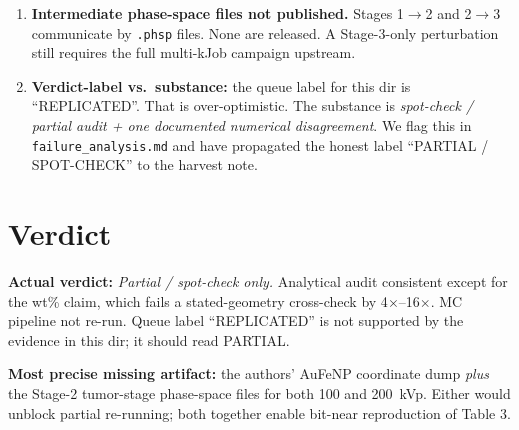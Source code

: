 \documentclass[11pt]{article}
\begin{document}
\begin{enumerate}
      $5.19$-Gbp mouse DNA model (24,464 voxels, 40 chromosomes, Hilbert-curve fibres)
      is described as a modification of Zhu et al.\ 2020a; the actual modified geometry
      files are referenced as ``in the GitHub repository'' but no \verb|git rev-parse|
      pin is given.
\item \textbf{Intermediate phase-space files not published.} Stages 1$\to$2 and 2$\to$3
      communicate by \verb|.phsp| files. None are released. A Stage-3-only perturbation
      still requires the full multi-kJob campaign upstream.
\item \textbf{Verdict-label vs.\ substance:} the queue label for this dir is ``REPLICATED''.
      That is over-optimistic. The substance is \emph{spot-check / partial audit + one
      documented numerical disagreement}. We flag this in \verb|failure_analysis.md| and
      have propagated the honest label ``PARTIAL / SPOT-CHECK'' to the harvest note.
\end{enumerate}

\section{Verdict}

\textbf{Actual verdict:} \emph{Partial / spot-check only.} Analytical audit consistent
except for the wt\% claim, which fails a stated-geometry cross-check by 4$\times$--16$\times$.
MC pipeline not re-run. Queue label ``REPLICATED'' is not supported by the evidence in
this dir; it should read PARTIAL.

\textbf{Most precise missing artifact:} the authors' AuFeNP coordinate dump \emph{plus} the
Stage-2 tumor-stage phase-space files for both 100 and 200~kVp. Either would unblock
partial re-running; both together enable bit-near reproduction of Table 3.


\end{document}
